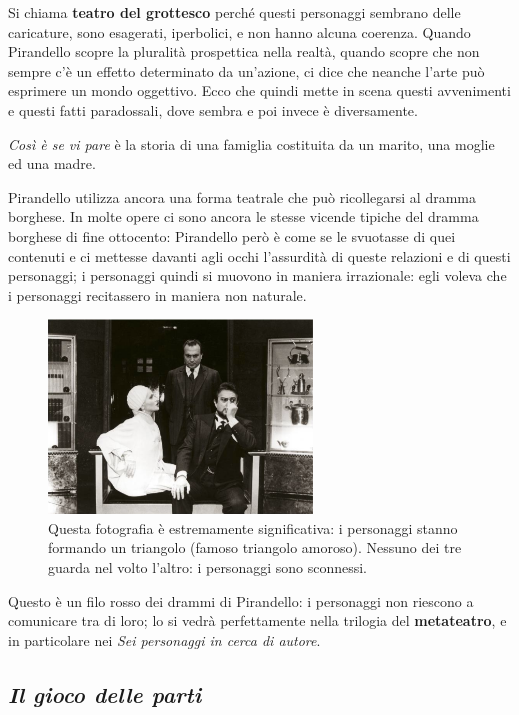 \documentclass[a4paper, twoside, titlepage]{book}
\newcounter{mar}
\begin{document}
Si chiama \textbf{teatro del grottesco} perché questi personaggi sembrano delle caricature, sono esagerati, iperbolici, e non hanno alcuna coerenza.
Quando Pirandello scopre la pluralità prospettica nella realtà, quando scopre che non sempre c’è un effetto determinato da un’azione, ci dice che neanche l’arte può esprimere un mondo oggettivo.
Ecco che quindi mette in scena questi avvenimenti e questi fatti paradossali, dove sembra e poi invece è diversamente.

\textit{Così è se vi pare} è la storia di una famiglia costituita da un marito, una moglie ed una madre.

Pirandello utilizza ancora una forma teatrale che può ricollegarsi al dramma borghese.
In molte opere ci sono ancora le stesse vicende tipiche del dramma borghese di fine ottocento: Pirandello però è come se le svuotasse di quei contenuti e ci mettesse davanti agli occhi l’assurdità di queste relazioni e di questi personaggi; i personaggi quindi si muovono in maniera irrazionale: egli voleva che i personaggi recitassero in maniera non naturale.

\begin{figure}
\begin{center}
\includegraphics[width=7cm]{2}
\end{center}
\caption{Questa fotografia è estremamente significativa: i personaggi stanno formando un triangolo (famoso triangolo amoroso). Nessuno dei tre guarda nel volto l’altro: i personaggi sono sconnessi.}
\end{figure}

Questo è un filo rosso dei drammi di Pirandello: i personaggi non riescono a comunicare tra di loro; lo si vedrà perfettamente nella trilogia del \textbf{metateatro}, e in particolare nei \textit{Sei personaggi in cerca di autore}.

\subsection{\textit{Il gioco delle parti}}
\end{document}
